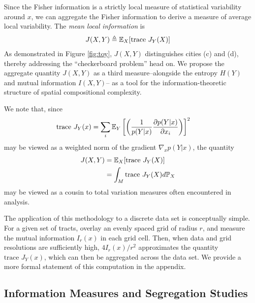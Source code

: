 	Since the Fisher information is a strictly local measure of statistical variability around $x$, we can aggregate the Fisher information to derive a measure of average local variability. The \emph{mean local information} is 
	\begin{equation}
	J(X,Y) \triangleq \mathbb{E}_X[\text{trace }J_Y(X)] \label{eq:def_J}
	\end{equation} 
	As demonstrated in Figure \ref{fig:toy}, $J(X,Y)$ distinguishes cities (c) and (d), thereby addressing the ``checkerboard problem'' head on. We propose the aggregate quantity $J(X,Y)$ as a third  measure--alongside the entropy $H(Y)$ and mutual information $I(X,Y)$-- as a tool for the information-theoretic structure of spatial compositional complexity. 

	We note that, since 
	\begin{align}
		\text{trace } J_Y(x) &=  \sum_i \mathbb{E}_Y\left[ \left(\frac{1}{p(Y|x)} \frac{\partial p(Y|x)}{\partial x_i}\right)\right]^2\;
	\end{align}
	may be viewed as a weighted norm of the gradient $\nabla_x p(Y|x)$, the quantity 
	\begin{align}
		J(X,Y) &= \mathbb{E}_X[\text{trace } J_Y(X)] \\
		&= \int_M \text{trace } J_Y(X) d\mathbb{P}_X
	\end{align}
	may be viewed as a cousin to total variation measures often encountered in analysis. 

	The application of this methodology to a discrete data set is conceptually simple. For a given set of tracts, overlay an evenly spaced grid of radius $r$, and measure the mutual information $I_r(x)$ in each grid cell. Then, when data and grid resolutions are sufficiently high, $4I_r(x) / r^2$ approximates the quantity $\text{trace }J_Y(x)$, which can then be aggregated across the data set. We provide a more formal statement of this computation in the appendix. 

\subsection{Information Measures and Segregation Studies}

